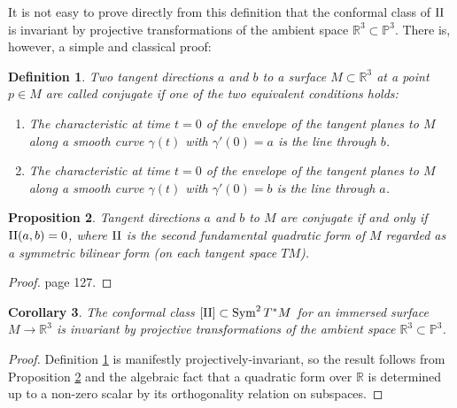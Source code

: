 \documentclass[12pt]{article}
\numberwithin{equation}{section}
\theoremstyle{plain}
\newtheorem{definition}{Definition}[section]
\newtheorem{corollary}[definition]{Corollary}
\newtheorem{proposition}[definition]{Proposition}
\theoremstyle{definition}
\renewcommand{\P}{\mathbb{P}}
\newcommand{\R}{\mathbb{R}}
\newcommand{\II}{\textnormal{II}}
\newcommand{\ra}{\rightarrow}
\begin{document}
It is not easy to prove directly from this definition that the conformal class of $\II$ is invariant by projective transformations of the ambient space $\R^{3}\subset \P^{3}$. There is, however, a simple and classical proof:

\begin{definition}\label{conjdef} Two tangent directions $a$ and $b$ to a surface $M\subset \R^{3}$ at a point $p\in M$ are called \emph{conjugate} if one of the two equivalent conditions holds:
\begin{enumerate}
\itemsep0em
\item{The characteristic at time $t=0$ of the envelope of the tangent planes to $M$ along a smooth curve $\gamma(t)$ with $\gamma'(0)=a$ is the line through $b$.}
\item{The characteristic at time $t=0$ of the envelope of the tangent planes to $M$ along a smooth curve $\gamma(t)$ with $\gamma'(0)=b$ is the line through $a$.}
\end{enumerate}
\end{definition}
\begin{proposition}\label{conjii} Tangent directions $a$ and $b$ to $M$ are conjugate if and only if $\II(a,b)=0$, where $\II$ is the second fundamental quadratic form of $M$ regarded as a symmetric bilinear form (on each tangent space $TM$).
\end{proposition}
\begin{proof}\cite{eisenhardt} page 127.
\end{proof}
\begin{corollary} The conformal class $[\II]\subset \operatorname{Sym}^{2}T^{*}M$ for an immersed surface $M\ra \R^{3}$ is invariant by projective transformations of the ambient space $\R^{3}\subset \P^{3}$.
\end{corollary}
\begin{proof} Definition \ref{conjdef} is manifestly projectively-invariant, so the result follows from Proposition \ref{conjii} and the algebraic fact that a quadratic form over $\R$ is determined up to a non-zero scalar by its orthogonality relation on subspaces.
\end{proof}
\end{document}
